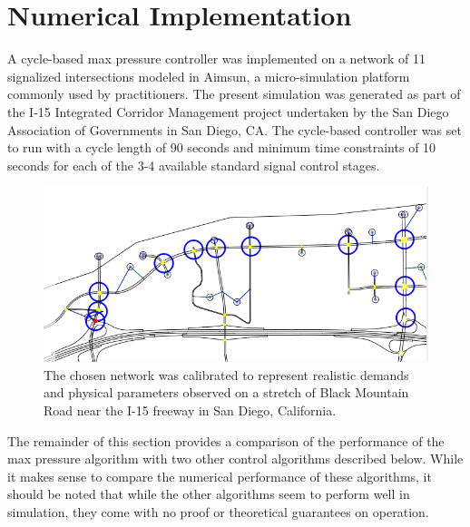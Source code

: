 \section{Numerical Implementation}
A cycle-based max pressure controller was implemented on a network of 11 signalized intersections modeled in Aimsun, a micro-simulation platform commonly used by practitioners. The present simulation was generated as part of the I-15 Integrated Corridor Management project undertaken by the San Diego Association of Governments in San Diego, CA. 
The cycle-based controller was set to run with a cycle length of 90 seconds and minimum time constraints of 10 seconds for each of the 3-4 available standard signal control stages.  
\begin{figure}[h!]
\vspace{-.2em}
\centering
\includegraphics[width=.8\columnwidth]{./i15network.png}
\caption{The chosen network was calibrated to represent realistic demands and physical parameters observed on a stretch of Black Mountain Road near the I-15 freeway in San Diego, California.}
\end{figure}

The remainder of this section provides a comparison of the performance of the max pressure algorithm with two other control algorithms described below. While it makes sense to compare the numerical performance of these algorithms, it should be noted that while the other algorithms seem to perform well in simulation, they come with no proof or theoretical guarantees on operation.
 
